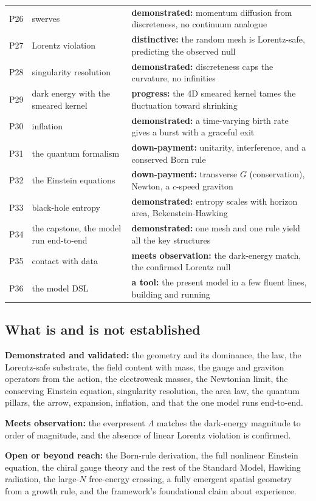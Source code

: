 {\begin{longtable}{>{\raggedright}p{} >{\raggedright}p{} >{\raggedright\arraybackslash}p{}}
P26 & swerves & \textbf{demonstrated:} momentum diffusion from discreteness, no continuum analogue \\
P27 & Lorentz violation & \textbf{distinctive:} the random mesh is Lorentz-safe, predicting the observed null \\
P28 & singularity resolution & \textbf{demonstrated:} discreteness caps the curvature, no infinities \\
P29 & dark energy with the smeared kernel & \textbf{progress:} the 4D smeared kernel tames the fluctuation toward shrinking \\
P30 & inflation & \textbf{demonstrated:} a time-varying birth rate gives a burst with a graceful exit \\
P31 & the quantum formalism & \textbf{down-payment:} unitarity, interference, and a conserved Born rule \\
P32 & the Einstein equations & \textbf{down-payment:} transverse $G$ (conservation), Newton, a $c$-speed graviton \\
P33 & black-hole entropy & \textbf{demonstrated:} entropy scales with horizon area, Bekenstein-Hawking \\
P34 & the capstone, the model run end-to-end & \textbf{demonstrated:} one mesh and one rule yield all the key structures \\
P35 & contact with data & \textbf{meets observation:} the dark-energy match, the confirmed Lorentz null \\
P36 & the model DSL & \textbf{a tool:} the present model in a few fluent lines, building and running \\
\end{longtable}
}

\subsection{What is and is not established}

\textbf{Demonstrated and validated:} the geometry and its dominance, the law, the
Lorentz-safe substrate, the field content with mass, the gauge and graviton operators
from the action, the electroweak masses, the Newtonian limit, the conserving Einstein
equation, singularity resolution, the area law, the quantum pillars, the arrow,
expansion, inflation, and that the one model runs end-to-end.

\textbf{Meets observation:} the everpresent $\Lambda$ matches the dark-energy magnitude
to order of magnitude, and the absence of linear Lorentz violation is confirmed.

\textbf{Open or beyond reach:} the Born-rule derivation, the full nonlinear Einstein
equation, the chiral gauge theory and the rest of the Standard Model, Hawking
radiation, the large-$N$ free-energy crossing, a fully emergent spatial geometry from a
growth rule, and the framework's foundational claim about experience.
